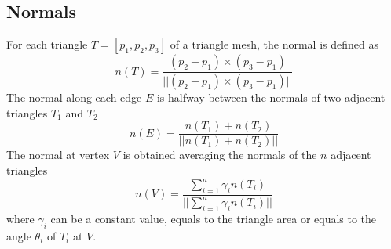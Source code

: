 \subsection{Normals}
For each triangle $T=[p_1, p_2, p_3]$ of a triangle mesh, the normal is defined as
$$n(T) = \frac{(p_2 - p_1) \times (p_3 - p_1)}{||(p_2 - p_1) \times (p_3 - p_1)||}$$
The normal along each edge $E$ is halfway between the normals of two adjacent triangles $T_1$ and $T_2$
$$n(E) = \frac{n(T_1) + n(T_2)}{||n(T_1) + n(T_2)||}$$
The normal at vertex $V$ is obtained averaging the normals of the $n$ adjacent triangles
$$n(V) = \frac{\sum_{i =1}^n \gamma_i n(T_i)}{||\sum_{i =1}^n \gamma_i n(T_i)||}$$
where $\gamma_i$ can be a constant value, equals to the triangle area or equals to the angle $\theta_i$ of $T_i$ at $V$.
\cite{geometryprocessing}

